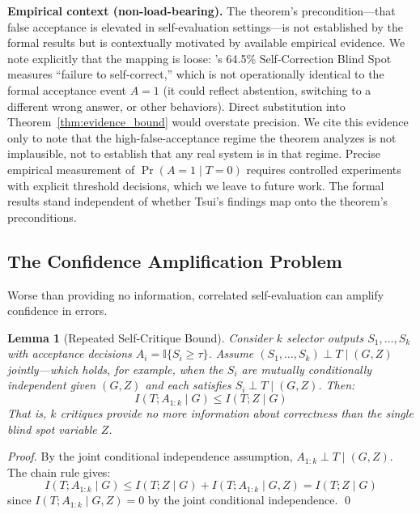 \documentclass[11pt]{article}
\newtheorem{lemma}[theorem]{Lemma}
\begin{document}
\textbf{Empirical context (non-load-bearing).} The theorem's precondition---that false
acceptance is elevated in self-evaluation settings---is not established by the formal
results but is contextually motivated by available empirical evidence. We note explicitly
that the mapping is loose: \citet{tsui2025selfcorrection}'s 64.5\% Self-Correction Blind
Spot measures ``failure to self-correct,'' which is not operationally identical to the
formal acceptance event $A=1$ (it could reflect abstention, switching to a different wrong
answer, or other behaviors). Direct substitution into Theorem~\ref{thm:evidence_bound}
would overstate precision. We cite this evidence only to note that the high-false-acceptance
regime the theorem analyzes is not implausible, not to establish that any real system is
in that regime. Precise empirical measurement of $\Pr(A=1 \mid T=0)$ requires controlled
experiments with explicit threshold decisions, which we leave to future work. The formal
results stand independent of whether Tsui's findings map onto the theorem's preconditions.

\subsection{The Confidence Amplification Problem}

Worse than providing no information, correlated self-evaluation can amplify confidence in
errors.

\begin{lemma}[Repeated Self-Critique Bound]
\label{lem:repeated}
Consider $k$ selector outputs $S_1, \ldots, S_k$ with acceptance decisions
$A_i = \mathbb{I}\{S_i \geq \tau\}$. Assume $(S_1, \ldots, S_k) \perp T \mid (G, Z)$
jointly---which holds, for example, when the $S_i$ are mutually conditionally independent
given $(G, Z)$ and each satisfies $S_i \perp T \mid (G, Z)$. Then:
\begin{equation}
I(T; A_{1:k} \mid G) \leq I(T; Z \mid G)
\end{equation}
That is, $k$ critiques provide no more information about correctness than the single blind
spot variable $Z$.
\end{lemma}

\begin{proof}
By the joint conditional independence assumption, $A_{1:k} \perp T \mid (G, Z)$. The chain
rule gives:
\begin{equation}
I(T; A_{1:k} \mid G) \leq I(T; Z \mid G) + I(T; A_{1:k} \mid G, Z) = I(T; Z \mid G)
\end{equation}
since $I(T; A_{1:k} \mid G, Z) = 0$ by the joint conditional independence. \qed
\end{proof}
\end{document}
